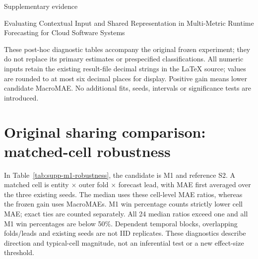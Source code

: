 \documentclass[a4paper,11pt]{article}
\begin{document}
\begin{center}
{\Large Supplementary evidence}\par\medskip
Evaluating Contextual Input and Shared Representation in Multi-Metric
Runtime Forecasting for Cloud Software Systems
\end{center}

These post-hoc diagnostic tables accompany the original frozen experiment;
they do not replace its primary estimates or prespecified classifications.
All numeric inputs retain the existing result-file decimal strings in the
LaTeX source; values are rounded to at most six decimal places for display.
Positive gain means lower candidate MacroMAE. No additional fits, seeds,
intervals or significance tests are introduced.

\section*{Original sharing comparison: matched-cell robustness}
In Table~\ref{tab:supp-m1-robustness}, the candidate is M1 and reference S2.
A matched cell is entity $\times$ outer fold $\times$ forecast lead, with
MAE first averaged over the three existing seeds. The median uses these
cell-level MAE ratios, whereas the frozen gain uses MacroMAEs. M1 win
percentage counts strictly lower cell MAE; exact ties are counted separately.
All 24 median ratios exceed one and all M1 win percentages are below 50\%.
Dependent temporal blocks, overlapping folds/leads and existing seeds are
not IID replicates. These diagnostics describe direction and typical-cell
magnitude, not an inferential test or a new effect-size threshold.
\end{document}
